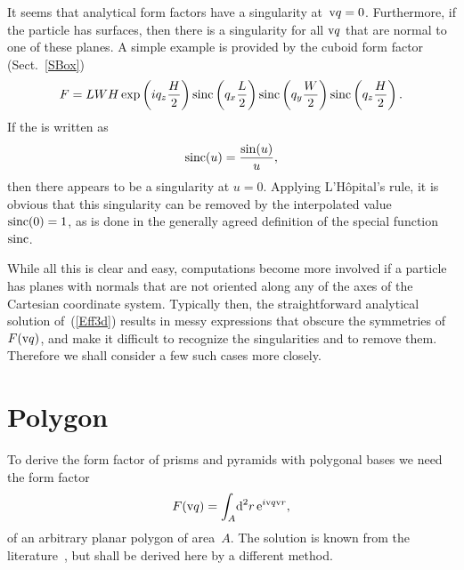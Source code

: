 %
It seems that  analytical form factors have a singularity at~$\text{v}{q}=0$.
Furthermore, if the particle has  surfaces,
then there is a singularity for all $\text{v}{q}$ that are normal to one of these planes.
A simple example is provided by the cuboid form factor (Sect.~\ref{SBox})
\begin{equation}
F= L W H\exp\left(i q_z \frac{H}{2}\right) \operatorname{sinc}\left(q_x \frac{L}{2}\right)
\operatorname{sinc}\left(q_y \frac{W}{2}\right) \operatorname{sinc}\left(q_z \frac{H}{2}\right).
\end{equation}
If the  is written as
\begin{equation}
  \operatorname{sinc}(u) = \frac{\sin(u)}{u},
\end{equation}
then there appears to be a singularity at $u=0$.
Applying L'H\^opital's rule, it is obvious
that this singularity can be removed by the interpolated value
$\operatorname{sinc}(0)=1$,
as is done in the generally agreed definition of the special function~$\operatorname{sinc}$.

While all this is clear and easy,
computations become more involved
if a particle has planes with normals that are not oriented along
any of the axes of the Cartesian coordinate system.
Typically then, the straightforward analytical solution of~(\ref{Eff3d})
results in messy expressions that obscure the symmetries of~$F(\text{v}{q})$,
and make it difficult to recognize the singularities and
to remove them.
Therefore we shall consider a few such cases more closely.


\section{Polygon}\label{SFFPolygon}

%
\def\R{\v{R}}
\def\E{\v{E}}
\def\x{\v{x}}
\def\V{\v{V}}
\def\qp{\v{p}}
\def\n{\v{\hat n}}
\def\uqp{\v{\hat p}}

To derive the form factor of prisms and pyramids with polygonal bases
we need the form factor
\begin{equation}\label{Eff2d}
  F(\text{v}{q})=\int_A\!\text{d}^2r\, \text{e}^{i\text{v}{q}\text{v}{r}},
\end{equation}
of an arbitrary planar polygon of area~$A$.
The solution is known from the literature~\cite{LeMi83},
but shall be derived here by a different method.

